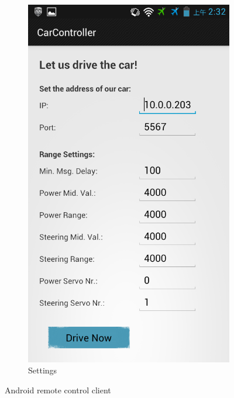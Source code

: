 \documentclass[a4paper
               ,10pt
               ,DIV=10 %
               ,BCOR=0.3cm
               ,pagesize %
               ,headings=small
               ,bibtotoc
               ]
               {scrartcl}
\begin{document}
\begin{figure}[H]
\begin{subfigure}[b]{0.3\textwidth}
    \includegraphics[width=\textwidth]{pic/figand2.png}
    \caption{Settings}
		\label{figand2}
  \end{subfigure}
  \caption{Android remote control client}
\end{figure}
\end{document}
